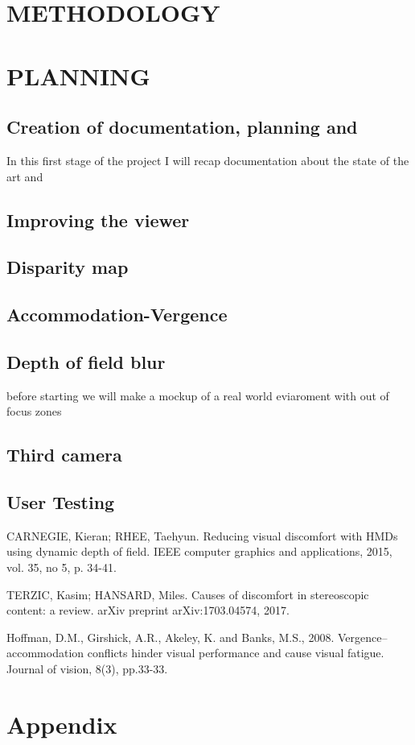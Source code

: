 \documentclass[10pt,a4paper,twocolumn,twoside]{article}
\begin{document}
\section{METHODOLOGY}

\section{PLANNING}
\subsection{Creation of documentation, planning and }
In this first stage of the project I will recap documentation about the state of the art and 
\subsection{Improving the viewer}
\subsection{Disparity map}
\subsection{Accommodation-Vergence}
\subsection{Depth of field blur}
before starting we will make a mockup of a real world eviaroment with out of focus zones 
\subsection{Third camera}
\subsection{User Testing}

\begin{thebibliography}{11}
CARNEGIE, Kieran; RHEE, Taehyun. Reducing visual discomfort with HMDs using dynamic depth of field. IEEE computer graphics and applications, 2015, vol. 35, no 5, p. 34-41.

TERZIC, Kasim; HANSARD, Miles. Causes of discomfort in stereoscopic content: a review. arXiv preprint arXiv:1703.04574, 2017.

Hoffman, D.M., Girshick, A.R., Akeley, K. and Banks, M.S., 2008. Vergence–accommodation conflicts hinder visual performance and cause visual fatigue. Journal of vision, 8(3), pp.33-33.


\end{thebibliography}

\appendix

\section*{Appendix}
\end{document}
